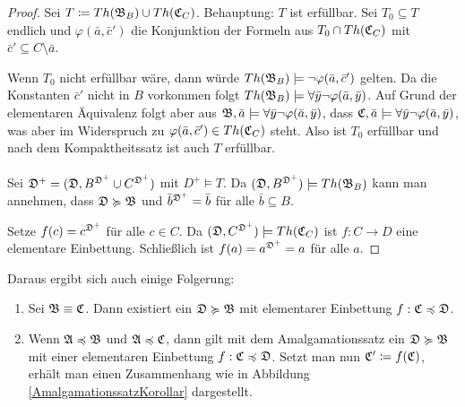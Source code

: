 \begin{proof}
	Sei $T\coloneqq Th(\mathfrak{B}_B)\cup Th(\mathfrak{C}_C)$. Behauptung: $T$ ist erfüllbar. Sei $T_0\subseteq T$ endlich und $\varphi(\bar{a},\bar{c}')$ die Konjunktion der Formeln aus $T_0\cap Th(\mathfrak{C}_C)$ mit $\bar{c}'\subseteq C\setminus \bar{a}$.
	
	Wenn $T_0$ nicht erfüllbar wäre, dann würde $Th(\mathfrak{B}_B)\models\neg\varphi(\bar{a},\bar{c}')$ gelten. 
	Da die Konstanten $\bar{c}'$ nicht in $B$ vorkommen folgt $Th(\mathfrak{B}_B)\models\forall\bar{y}\neg\varphi(\bar{a},\bar{y})$.
	Auf Grund der elementaren Äquivalenz folgt aber aus $\mathfrak{B},\bar{a}\models\forall\bar{y}\neg\varphi(\bar{a},\bar{y})$, dass $\mathfrak{C},\bar{a}\models\forall\bar{y}\neg\varphi(\bar{a},\bar{y})$, was aber im Widerspruch zu $\varphi(\bar{a},\bar{c}')\in Th(\mathfrak{C}_C)$ steht. 
	Also ist $T_0$ erfüllbar und nach dem Kompaktheitssatz ist auch $T$ erfüllbar.
	\\
	\\
	Sei $\mathfrak{D}^+=(\mathfrak{D}, B^{\mathfrak{D}^+}\cup C^{\mathfrak{D}^+})$ mit $D^+\models T$. Da $(\mathfrak{D},B^{\mathfrak{D}^+})\models Th(\mathfrak{B}_B)$ kann man annehmen, dass $\mathfrak{D}\succcurlyeq\mathfrak{B}$ und $\bar{b}^{\mathfrak{D}^+}=\bar{b}$ für alle $\bar{b}\subseteq B$.
	
	Setze $f(c)=c^{\mathfrak{D}^+}$ für alle $c\in C$. Da $(\mathfrak{D},C^{\mathfrak{D}^+})\models Th(\mathfrak{C}_C)$ ist $f:C\to D$ eine elementare Einbettung. 
	Schließlich ist $f(a)=a^{\mathfrak{D}^+}=a$ für alle $a$.
\end{proof}

Daraus ergibt sich auch einige Folgerung: 
\begin{enumerate}
	\item Sei $\mathfrak{B}\equiv \mathfrak{C}$. Dann existiert ein $\mathfrak{D}\succcurlyeq\mathfrak{B}$ mit elementarer Einbettung $f:\mathfrak{C}\preccurlyeq\mathfrak{D}$.
	\item Wenn $\mathfrak{A}\preccurlyeq\mathfrak{B}$ und $\mathfrak{A}\preccurlyeq\mathfrak{C}$, dann gilt mit dem Amalgamationssatz ein $\mathfrak{D}\succcurlyeq\mathfrak{B}$ mit einer elementaren Einbettung $f:\mathfrak{C}\preccurlyeq\mathfrak{D}$. Setzt man nun $\mathfrak{C}'\coloneqq f(\mathfrak{C})$, erhält man einen Zusammenhang wie in Abbildung \ref{AmalgamationssatzKorollar} dargestellt.
\end{enumerate}


